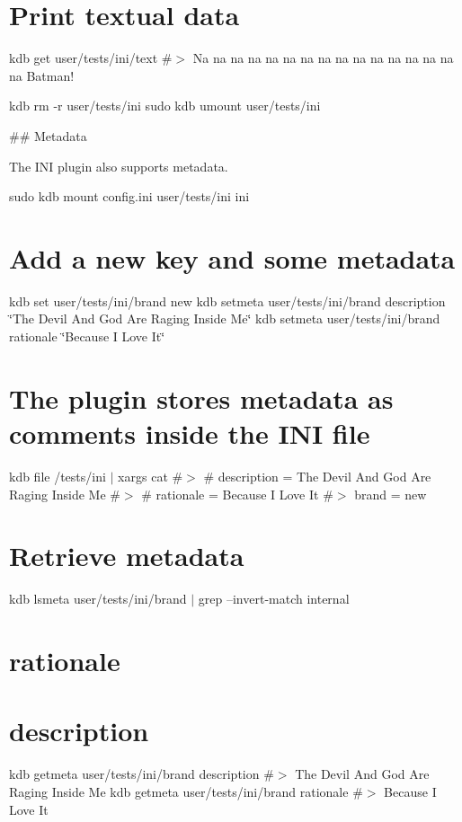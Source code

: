 \section*{Print textual data}

kdb get user/tests/ini/text \#$>$ Na na na na na na na na na na na na na na na na Batman!

kdb rm -\/r user/tests/ini sudo kdb umount user/tests/ini 
\begin{DoxyCode}
## Metadata

The INI plugin also supports metadata.
\end{DoxyCode}
 sudo kdb mount config.\+ini user/tests/ini ini

\section*{Add a new key and some metadata}

kdb set user/tests/ini/brand new kdb setmeta user/tests/ini/brand description \char`\"{}\+The Devil And God Are Raging Inside Me\char`\"{} kdb setmeta user/tests/ini/brand rationale \char`\"{}\+Because I Love It\char`\"{}

\section*{The plugin stores metadata as comments inside the I\+NI file}

kdb file /tests/ini $\vert$ xargs cat \#$>$ \# description = The Devil And God Are Raging Inside Me \#$>$ \# rationale = Because I Love It \#$>$ brand = new

\section*{Retrieve metadata}

kdb lsmeta user/tests/ini/brand $\vert$ grep --invert-\/match \textquotesingle{}internal\textquotesingle{} \section*{rationale}

\section*{description}

kdb getmeta user/tests/ini/brand description \#$>$ The Devil And God Are Raging Inside Me kdb getmeta user/tests/ini/brand rationale \#$>$ Because I Love It

